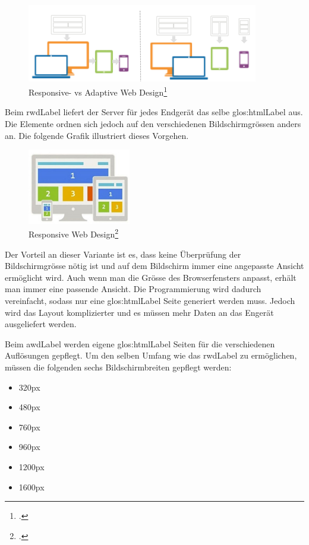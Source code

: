\begin{figure}[H]
  \centering
  \includegraphics[width=0.9\textwidth]{images/rwd-vs-awd.png}
  \caption{Responsive- vs Adaptive Web Design\footcite{Responsive_vs_Adaptive_Design_for_UI_2015-05-31}}
  \label{fig:requirementsengineerin:endgeraete:responsivevsadaptive:comparision}
\end{figure}

Beim \gls{rwdLabel} liefert der Server für jedes Endgerät das selbe \Gls{glos:htmlLabel} aus. Die Elemente ordnen sich jedoch auf den verschiedenen Bildschirmgrössen anders an. Die folgende Grafik illustriert dieses Vorgehen.

\begin{figure}[H]
  \centering
  \includegraphics[width=0.4\textwidth]{images/rwd.jpg}
  \caption{Responsive Web Design\footcite{The_Difference_Between_Adaptive_Design_And_Responsive_Design_2015-05-31}}
  \label{fig:requirementsengineerin:endgeraete:responsivevsadaptive:rwd}
\end{figure}

Der Vorteil an dieser Variante ist es, dass keine Überprüfung der Bildschirmgrösse nötig ist und auf dem Bildschirm immer eine angepasste Ansicht ermöglicht wird. Auch wenn man die Grösse des Browserfensters anpasst, erhält man immer eine passende Ansicht. Die Programmierung wird dadurch vereinfacht, sodass nur eine \Gls{glos:htmlLabel} Seite generiert werden muss. Jedoch wird das Layout komplizierter und es müssen mehr Daten an das Engerät ausgeliefert werden.

Beim \gls{awdLabel} werden eigene \Gls{glos:htmlLabel} Seiten für die verschiedenen Auflösungen gepflegt. Um den selben Umfang wie das \gls{rwdLabel} zu ermöglichen, müssen die folgenden sechs Bildschirmbreiten gepflegt werden:
\begin{itemize}
\item 320px
\item 480px
\item 760px
\item 960px
\item 1200px
\item 1600px
\end{itemize}

